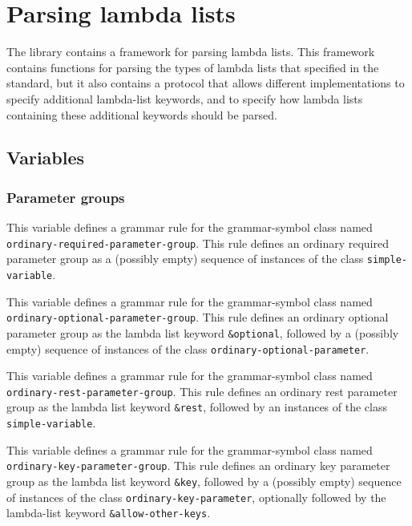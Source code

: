 \chapter{Parsing lambda lists}
\label{chap-user-parsing-lambda-lists}

The \sysname{} library contains a framework for parsing lambda lists.
This framework contains functions for parsing the types of lambda
lists that specified in the \commonlisp{} standard, but it also
contains a protocol that allows different implementations to specify
additional lambda-list keywords, and to specify how lambda lists
containing these additional keywords should be parsed.

\section{Variables}

\subsection{Parameter groups}


This variable defines a grammar rule for the grammar-symbol class
named \texttt{ordinary-required-parameter-group}.  This rule defines
an ordinary required parameter group as a (possibly empty) sequence of
instances of the class \texttt{simple-variable}.


This variable defines a grammar rule for the grammar-symbol class
named \texttt{ordinary-optional-parameter-group}.  This rule defines
an ordinary optional parameter group as the lambda list keyword
\texttt{\&optional}, followed by a (possibly empty) sequence of
instances of the class \texttt{ordinary-optional-parameter}.


This variable defines a grammar rule for the grammar-symbol class
named \texttt{ordinary-rest-parameter-group}.  This rule defines an
ordinary rest parameter group as the lambda list keyword
\texttt{\&rest}, followed by an instances of the class
\texttt{simple-variable}.


This variable defines a grammar rule for the grammar-symbol class
named \texttt{ordinary-key-parameter-group}.  This rule defines
an ordinary key parameter group as the lambda list keyword
\texttt{\&key}, followed by a (possibly empty) sequence of
instances of the class \texttt{ordinary-key-parameter}, optionally
followed by the lambda-list keyword \texttt{\&allow-other-keys}.

